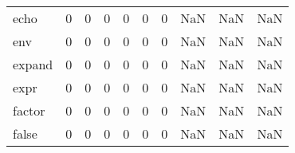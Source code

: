 \begin{longtable}{lrrrrrrrrr}
echo      &                                       0 &                                                  0 &                                                  0 &                                                  0 &                                                  0 &                                                  0 &                                                NaN &                                    NaN &                                  NaN \\
env       &                                       0 &                                                  0 &                                                  0 &                                                  0 &                                                  0 &                                                  0 &                                                NaN &                                    NaN &                                  NaN \\
expand    &                                       0 &                                                  0 &                                                  0 &                                                  0 &                                                  0 &                                                  0 &                                                NaN &                                    NaN &                                  NaN \\
expr      &                                       0 &                                                  0 &                                                  0 &                                                  0 &                                                  0 &                                                  0 &                                                NaN &                                    NaN &                                  NaN \\
factor    &                                       0 &                                                  0 &                                                  0 &                                                  0 &                                                  0 &                                                  0 &                                                NaN &                                    NaN &                                  NaN \\
false     &                                       0 &                                                  0 &                                                  0 &                                                  0 &                                                  0 &                                                  0 &                                                NaN &                                    NaN &                                  NaN \\

\end{longtable}
